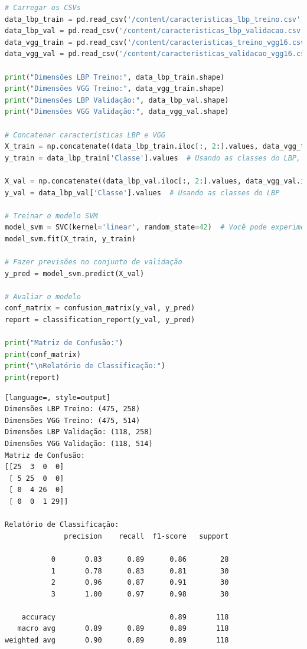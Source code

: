 \begin{lstlisting}[language=Python, style=input]
# Carregar os CSVs
data_lbp_train = pd.read_csv('/content/caracteristicas_lbp_treino.csv')
data_lbp_val = pd.read_csv('/content/caracteristicas_lbp_validacao.csv')
data_vgg_train = pd.read_csv('/content/caracteristicas_treino_vgg16.csv')
data_vgg_val = pd.read_csv('/content/caracteristicas_validacao_vgg16.csv')

print("Dimensões LBP Treino:", data_lbp_train.shape)
print("Dimensões VGG Treino:", data_vgg_train.shape)
print("Dimensões LBP Validação:", data_lbp_val.shape)
print("Dimensões VGG Validação:", data_vgg_val.shape)

# Concatenar características LBP e VGG
X_train = np.concatenate((data_lbp_train.iloc[:, 2:].values, data_vgg_train.iloc[:, 2:].values), axis=1)  # Todas as colunas exceto as duas primeiras
y_train = data_lbp_train['Classe'].values  # Usando as classes do LBP, que são as mesmas

X_val = np.concatenate((data_lbp_val.iloc[:, 2:].values, data_vgg_val.iloc[:, 2:].values), axis=1)  # Para o conjunto de validação
y_val = data_lbp_val['Classe'].values  # Usando as classes do LBP

# Treinar o modelo SVM
model_svm = SVC(kernel='linear', random_state=42)  # Você pode experimentar outros kernels como 'rbf'
model_svm.fit(X_train, y_train)

# Fazer previsões no conjunto de validação
y_pred = model_svm.predict(X_val)

# Avaliar o modelo
conf_matrix = confusion_matrix(y_val, y_pred)
report = classification_report(y_val, y_pred)

print("Matriz de Confusão:")
print(conf_matrix)
print("\nRelatório de Classificação:")
print(report)
\end{lstlisting}
\begin{lstlisting}[language=, style=output]
Dimensões LBP Treino: (475, 258)
Dimensões VGG Treino: (475, 514)
Dimensões LBP Validação: (118, 258)
Dimensões VGG Validação: (118, 514)
Matriz de Confusão:
[[25  3  0  0]
 [ 5 25  0  0]
 [ 0  4 26  0]
 [ 0  0  1 29]]

Relatório de Classificação:
              precision    recall  f1-score   support

           0       0.83      0.89      0.86        28
           1       0.78      0.83      0.81        30
           2       0.96      0.87      0.91        30
           3       1.00      0.97      0.98        30

    accuracy                           0.89       118
   macro avg       0.89      0.89      0.89       118
weighted avg       0.90      0.89      0.89       118
\end{lstlisting}

